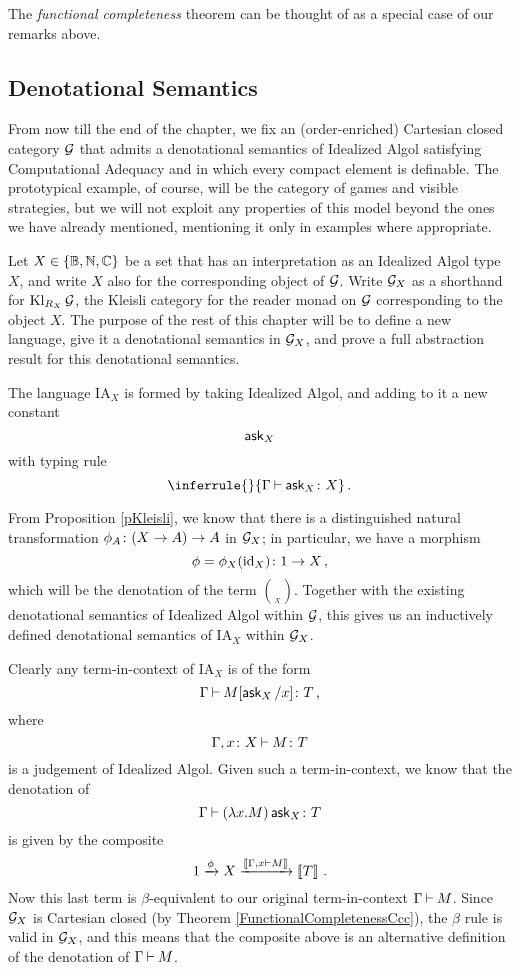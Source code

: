 \documentclass{article}
\begin{document}
The \emph{functional completeness} theorem \cite{FunctionalCompleteness} can be thought of as a special case of our remarks above.

\subsection{Denotational Semantics}

From now till the end of the chapter, we fix an (order-enriched) Cartesian closed category $\mathcal G$ that admits a denotational semantics of Idealized Algol satisfying Computational Adequacy and in which every compact element is definable.
The prototypical example, of course, will be the category of games and visible strategies, but we will not exploit any properties of this model beyond the ones we have already mentioned, mentioning it only in examples where appropriate.

Let $X\in \{\mathbb{B},\mathbb{N},\mathbb{C}\}$ be a set that has an interpretation as an Idealized Algol type $X$, and write $X$ also for the corresponding object of $\mathcal G$.
Write $\mathcal G_X$ as a shorthand for $\operatorname{Kl}_{R_X}\mathcal G$, the Kleisli category for the reader monad on $\mathcal G$ corresponding to the object $X$.  
The purpose of the rest of this chapter will be to define a new language, give it a denotational semantics in $\mathcal G_X$, and prove a full abstraction result for this denotational semantics.

\newcommand{\IAX}{{IA${}_X$}\xspace}
\begin{definition}[{The language \IAX}]
  The language \IAX is formed by taking Idealized Algol, and adding to it a new constant
  \[
    \operatorname{{\mathsf{ask}}}_X
    \]
  with typing rule
  \[
    \inferrule{ }{\Gamma \ts \ask_X \from X}\,.
    \]
\end{definition}

From Proposition \ref{pKleisli}, we know that there is a distinguished natural transformation $\phi_A \colon (X \to A) \to A$ in $\mathcal G_X$; in particular, we have a morphism
\[
  \phi = \phi_X(\operatorname{id}_X) \colon 1 \to X\,,
  \]
which will be the denotation of the term $\choose_X$.
Together with the existing denotational semantics of Idealized Algol within $\mathcal G$, this gives us an inductively defined denotational semantics of \IAX within $\mathcal G_X$.

Clearly any term-in-context of \IAX is of the form
\[
  \Gamma \mathbin{\vdash} M[\operatorname{{\mathsf{ask}}}_X/x]\colon T\,,
  \]
where
\[
  \Gamma,x\colon X \mathbin{\vdash} M \colon T
  \]
is a judgement of Idealized Algol.
Given such a term-in-context, we know that the denotation of
\[
  \Gamma\mathbin{\vdash} (\lambda x.M) \operatorname{{\mathsf{ask}}}_X \colon T
  \]
is given by the composite
\[
  1 \xrightarrow{\phi}
  X \xrightarrow{\left\llbracket\Gamma,x \mathbin{\vdash} M\right\rrbracket}
  \left\llbracket T\right\rrbracket\,.
  \]
Now this last term is $\beta$-equivalent to our original term-in-context $\Gamma\mathbin{\vdash} M$.  
Since $\mathcal G_X$ is Cartesian closed (by Theorem \ref{FunctionalCompletenessCcc}), the $\beta$ rule is valid in $\mathcal G_X$, and this means that the composite above is an alternative definition of the denotation of $\Gamma\mathbin{\vdash} M$.
\end{document}
